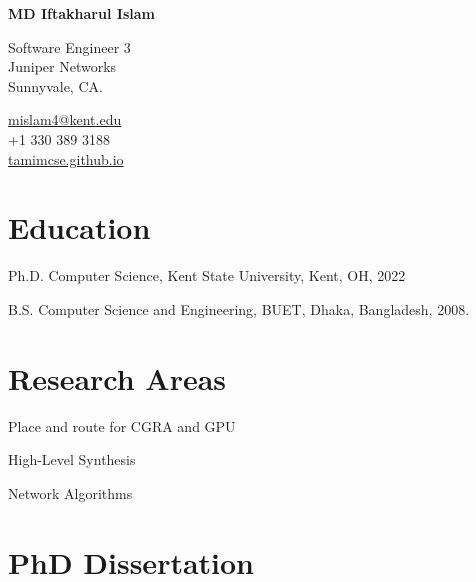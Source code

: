 \documentclass[11pt,letterpaper]{report}
\newcommand{\myname}{MD Iftakharul Islam}
\newcommand{\namefont}[1]{{\normalfont\bfseries\Huge{#1}}}
\newcommand{\listitemspace}{0.25em}
\renewenvironment{itemize}
{\begin{list}{}{\setlength{\leftmargin}{0em}
                \setlength{\parskip}{0em}
                \setlength{\itemsep}{\listitemspace}
                \setlength{\parsep}{\listitemspace}}}
{\end{list}}
\begin{document}
    \raggedright{}

    \namefont{\myname}

    \vspace{1em}
    \begin{minipage}[t]{0.700\textwidth}
        Software Engineer 3 \\
        Juniper Networks \\
        Sunnyvale, CA.
    \end{minipage}
    \begin{minipage}[t]{0.295\textwidth}
        \flushright{}
        \href{mailto:mislam4@kent.edu}{mislam4@kent.edu} \\
        +1 330 389 3188 \\
        \href{https://tamimcse.github.io/}{tamimcse.github.io}
    \end{minipage}


    \section*{Education}

    \begin{tablist}

        \item[Ph.D.] \tab{}Computer Science, Kent State University, Kent, OH, 2022
        \item[B.S.]  \tab{}Computer Science and Engineering, BUET, Dhaka, Bangladesh, 2008.

    \end{tablist}


    \section*{Research Areas}

    \begin{itemize}

        \item Place and route for CGRA and GPU
        \item High-Level Synthesis
        \item Network Algorithms

    \end{itemize}

    \section*{PhD Dissertation}
\end{document}
